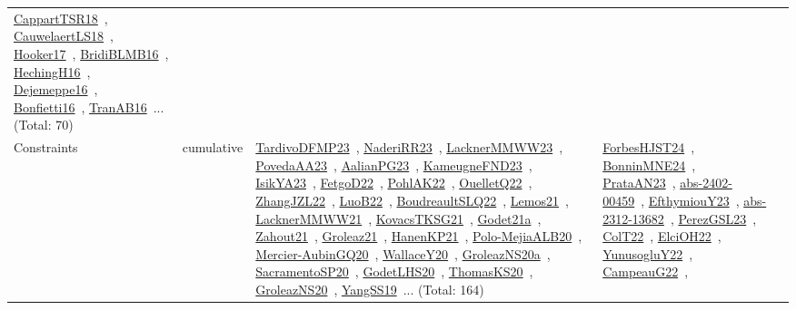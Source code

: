 {\begin{longtable}{lp{3cm}>{\raggedright\arraybackslash}p{6cm}>{\raggedright\arraybackslash}p{6cm}>{\raggedright\arraybackslash}p{8cm}}
\href{../works/CappartTSR18.pdf}{CappartTSR18}~\cite{CappartTSR18}, \href{../works/CauwelaertLS18.pdf}{CauwelaertLS18}~\cite{CauwelaertLS18}, \href{../works/Hooker17.pdf}{Hooker17}~\cite{Hooker17}, \href{../works/BridiBLMB16.pdf}{BridiBLMB16}~\cite{BridiBLMB16}, \href{../works/HechingH16.pdf}{HechingH16}~\cite{HechingH16}, \href{../works/Dejemeppe16.pdf}{Dejemeppe16}~\cite{Dejemeppe16}, \href{../works/Bonfietti16.pdf}{Bonfietti16}~\cite{Bonfietti16}, \href{../works/TranAB16.pdf}{TranAB16}~\cite{TranAB16}... (Total: 70)\\
Constraints & cumulative & \href{../works/TardivoDFMP23.pdf}{TardivoDFMP23}~\cite{TardivoDFMP23}, \href{../works/NaderiRR23.pdf}{NaderiRR23}~\cite{NaderiRR23}, \href{../works/LacknerMMWW23.pdf}{LacknerMMWW23}~\cite{LacknerMMWW23}, \href{../works/PovedaAA23.pdf}{PovedaAA23}~\cite{PovedaAA23}, \href{../works/AalianPG23.pdf}{AalianPG23}~\cite{AalianPG23}, \href{../works/KameugneFND23.pdf}{KameugneFND23}~\cite{KameugneFND23}, \href{../works/IsikYA23.pdf}{IsikYA23}~\cite{IsikYA23}, \href{../works/FetgoD22.pdf}{FetgoD22}~\cite{FetgoD22}, \href{../works/PohlAK22.pdf}{PohlAK22}~\cite{PohlAK22}, \href{../works/OuelletQ22.pdf}{OuelletQ22}~\cite{OuelletQ22}, \href{../works/ZhangJZL22.pdf}{ZhangJZL22}~\cite{ZhangJZL22}, \href{../works/LuoB22.pdf}{LuoB22}~\cite{LuoB22}, \href{../works/BoudreaultSLQ22.pdf}{BoudreaultSLQ22}~\cite{BoudreaultSLQ22}, \href{../works/Lemos21.pdf}{Lemos21}~\cite{Lemos21}, \href{../works/LacknerMMWW21.pdf}{LacknerMMWW21}~\cite{LacknerMMWW21}, \href{../works/KovacsTKSG21.pdf}{KovacsTKSG21}~\cite{KovacsTKSG21}, \href{../works/Godet21a.pdf}{Godet21a}~\cite{Godet21a}, \href{../works/Zahout21.pdf}{Zahout21}~\cite{Zahout21}, \href{../works/Groleaz21.pdf}{Groleaz21}~\cite{Groleaz21}, \href{../works/HanenKP21.pdf}{HanenKP21}~\cite{HanenKP21}, \href{../works/Polo-MejiaALB20.pdf}{Polo-MejiaALB20}~\cite{Polo-MejiaALB20}, \href{../works/Mercier-AubinGQ20.pdf}{Mercier-AubinGQ20}~\cite{Mercier-AubinGQ20}, \href{../works/WallaceY20.pdf}{WallaceY20}~\cite{WallaceY20}, \href{../works/GroleazNS20a.pdf}{GroleazNS20a}~\cite{GroleazNS20a}, \href{../works/SacramentoSP20.pdf}{SacramentoSP20}~\cite{SacramentoSP20}, \href{../works/GodetLHS20.pdf}{GodetLHS20}~\cite{GodetLHS20}, \href{../works/ThomasKS20.pdf}{ThomasKS20}~\cite{ThomasKS20}, \href{../works/GroleazNS20.pdf}{GroleazNS20}~\cite{GroleazNS20}, \href{../works/YangSS19.pdf}{YangSS19}~\cite{YangSS19}... (Total: 164) & \href{../works/ForbesHJST24.pdf}{ForbesHJST24}~\cite{ForbesHJST24}, \href{../works/BonninMNE24.pdf}{BonninMNE24}~\cite{BonninMNE24}, \href{../works/PrataAN23.pdf}{PrataAN23}~\cite{PrataAN23}, \href{../works/abs-2402-00459.pdf}{abs-2402-00459}~\cite{abs-2402-00459}, \href{../works/EfthymiouY23.pdf}{EfthymiouY23}~\cite{EfthymiouY23}, \href{../works/abs-2312-13682.pdf}{abs-2312-13682}~\cite{abs-2312-13682}, \href{../works/PerezGSL23.pdf}{PerezGSL23}~\cite{PerezGSL23}, \href{../works/ColT22.pdf}{ColT22}~\cite{ColT22}, \href{../works/ElciOH22.pdf}{ElciOH22}~\cite{ElciOH22}, \href{../works/YunusogluY22.pdf}{YunusogluY22}~\cite{YunusogluY22}, \href{../works/CampeauG22.pdf}{CampeauG22}~\cite{CampeauG22}, 
\end{longtable}}
